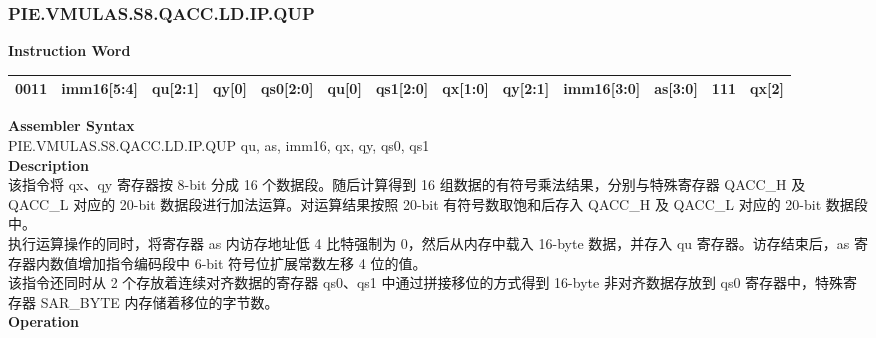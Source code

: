 \newpage
\subsubsection{PIE.VMULAS.S8.QACC.LD.IP.QUP}\label{instruction:PIEVMULASS8QACCLDIPQUP}
\setlength\tabcolsep{5pt}
\textbf{Instruction Word} \\
\begin{tabular}{|c|c|c|c|c|c|c|c|c|c|c|c|c|}
	\hline
	0011 & imm16[5:4] & qu[2:1] & qy[0] & qs0[2:0] & qu[0] & qs1[2:0] & qx[1:0] & qy[2:1] & imm16[3:0] & as[3:0] & 111 & qx[2] \\
	\hline
\end{tabular}

\textbf{Assembler Syntax} \\
PIE.VMULAS.S8.QACC.LD.IP.QUP qu, as, imm16, qx, qy, qs0, qs1 \\
\textbf{Description} \\
该指令将 qx、qy 寄存器按 8-bit 分成 16 个数据段。随后计算得到 16 组数据的有符号乘法结果，分别与特殊寄存器 QACC\_H 及 QACC\_L 对应的 20-bit 数据段进行加法运算。对运算结果按照 20-bit 有符号数取饱和后存入 QACC\_H 及 QACC\_L 对应的 20-bit 数据段中。\\
执行运算操作的同时，将寄存器 as 内访存地址低 4 比特强制为 0，然后从内存中载入 16-byte 数据，并存入 qu 寄存器。访存结束后，as 寄存器内数值增加指令编码段中 6-bit 符号位扩展常数左移 4 位的值。\\
该指令还同时从 2 个存放着连续对齐数据的寄存器 qs0、qs1 中通过拼接移位的方式得到 16-byte 非对齐数据存放到 qs0 寄存器中，特殊寄存器 SAR\_BYTE 内存储着移位的字节数。\\
\textbf{Operation}
